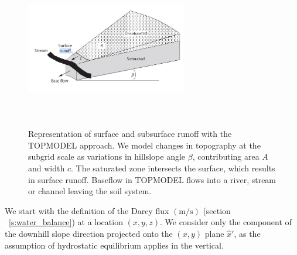 \documentclass[twoside,10pt]{report}
\begin{document}
\begin{figure}[htb]
\centering
\includegraphics[width=7cm,height=7cm,keepaspectratio]{CLIMA-land/LM_figures/baseflow.JPG}
\caption{Representation of surface and subsurface runoff with the TOPMODEL approach. We model changes in topography at the subgrid scale as variations in hillslope angle $\beta$, contributing area $A$ and width $c$.  The saturated zone intersects the surface, which results in surface runoff. Baseflow in TOPMODEL flows into a river, stream or channel leaving the soil system.}
\label{f:baseflow}
\end{figure}

We start with the definition of the Darcy flux $\mathrm{(m/s)}$ (section ~\ref{s:water_balance}) at a location $(x,y, z)$. We consider only the component of the downhill slope direction projected onto the $(x,y)$ plane $\hat{x}'$, as the assumption of hydrostatic equilibrium applies in the vertical.  
\end{document}
